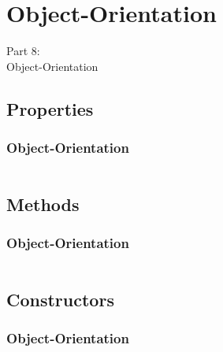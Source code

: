 {
\renewcommand{\bgcolor}{oop}

\section{Object-Orientation}
\begin{frame}
    \vspace{25mm}
    \begin{center}
        \Huge{Part 8:\\Object-Orientation}
    \end{center}
\end{frame}


\subsection{Properties}
\begin{frame}
    \frametitle{Object-Orientation }
    \vspace{2mm}
    
    \inputminted[fontsize=\small]{python}{../src/objectproperties.py}
\end{frame}

\subsection{Methods}
\begin{frame}
    \frametitle{Object-Orientation }
    \vspace{2mm}
    
    \inputminted[fontsize=\small]{python}{../src/objectmethods.py}
\end{frame}

\subsection{Constructors}
\begin{frame}
    \frametitle{Object-Orientation }
    \vspace{2mm}
    

\end{frame}}

